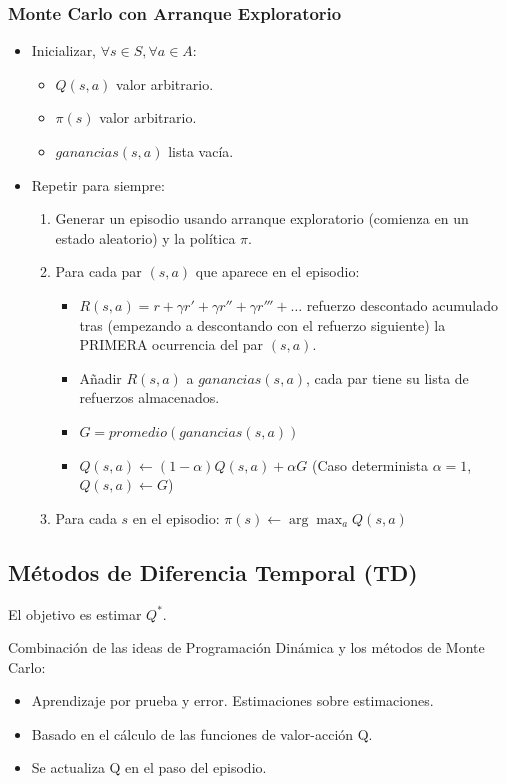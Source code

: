 \documentclass[12pt, twoside, openright]{report} %
\begin{document}
\subsubsection{Monte Carlo con Arranque Exploratorio}
\begin{itemize}
	\item Inicializar, $\forall s \in S, \forall a \in A$:
	      \begin{itemize}
		      \item $Q(s, a)$ valor arbitrario.
		      \item $\pi(s)$ valor arbitrario.
		      \item $ganancias(s, a)$ lista vacía.
	      \end{itemize}
	\item Repetir para siempre:
	      \begin{enumerate}
		      \item Generar un episodio usando arranque exploratorio (comienza en un estado aleatorio) y la política $\pi$.
		      \item Para cada par $(s, a)$ que aparece en el episodio:
		            \begin{itemize}
			            \item $R(s, a) = r + \gamma r'+ \gamma r''+ \gamma r'''+\dots$ refuerzo descontado acumulado tras (empezando a descontando con el refuerzo siguiente) la PRIMERA ocurrencia del par $(s, a)$.
			            \item Añadir $R(s, a)$ a $ganancias(s, a)$, cada par tiene su lista de refuerzos almacenados.
			            \item $G = promedio(ganancias(s, a))$
			            \item $Q(s, a) \leftarrow (1-\alpha)Q(s, a) + \alpha G$ (Caso determinista $\alpha = 1$, $Q(s, a) \leftarrow G$)
		            \end{itemize}
		      \item Para cada $s$ en el episodio: $\pi(s) \leftarrow \arg \max_a Q(s, a)$
	      \end{enumerate}
\end{itemize}

\subsection{Métodos de Diferencia Temporal (TD)}
El objetivo es estimar $Q^*$.

Combinación de las ideas de Programación Dinámica y los métodos de Monte Carlo:
\begin{itemize}
	\item Aprendizaje por prueba y error. Estimaciones sobre estimaciones.
	\item Basado en el cálculo de las funciones de valor-acción Q.
	\item Se actualiza Q en el paso del episodio.
\end{itemize}
\end{document}

